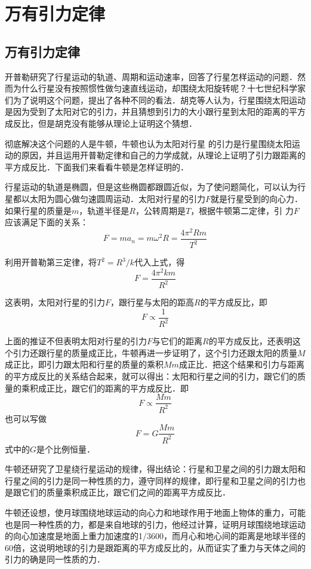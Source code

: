 \section{万有引力定律}
\subsection{万有引力定律} 

开普勒研究了行星运动的轨道、周期和运动速率，回答了行星怎样运动的问题．然而为什么行星没有按照惯性做匀速直线运动，却围绕太阳旋转呢？十七世纪科学家们为了说明这个问题，提出了各种不同的看法．胡克等人认为，行星围绕太阳运动是因为受到了太阳对它的引力，并且猜想到引力的大小跟行星到太阳的距离的平方成反比，但是胡克没有能够从理论上证明这个猜想．

彻底解决这个问题的人是牛顿，牛顿也认为太阳对行星
的引力是行星围绕太阳运动的原因，并且运用开普勒定律和自己的力学成就，从理论上证明了引力跟距离的平方成反比．下面我们来看看牛顿是怎样证明的．

行星运动的轨道是椭圆，但是这些椭圆都跟圆近似，为了使问题简化，可以认为行星都以太阳为圆心做匀速圆周运动．太阳对行星的引力$F$就是行星受到的向心力．如果行星的质量是$m$，轨道半径是$R$，公转周期是$T$，根据牛顿第二定律，引
力$F$应该满足下面的关系：
\[F=ma_n=m\omega^2 R=\frac{4\pi^2 Rm}{T^2} \]

利用开普勒第三定律，将$T^2=R^3/k$代入上式，得
\[F=\frac{4\pi^2km}{R^2} \]

这表明，太阳对行星的引力$F$，跟行星与太阳的距高$R$的平方成反比，即
\[F\propto \frac{1}{R^2} \]

上面的推证不但表明太阳对行星的引力$F$与它们的距离$R$的平方成反比，还表明这个引力还跟行星的质量成正比，牛顿再进一步证明了，这个引力还跟太阳的质量$M$成正比，即引力跟太阳和行星的质量的乘积$Mm$成正比．把这个结果和引力与距离的平方成反比的关系结合起来，就可以得出：太阳和行星之间的引力，跟它们的质量的乘积成正比，跟它们的距离的平方成反比．即
\[F\propto \frac{Mm}{R^2} \]
也可以写做
\[F=G\frac{Mm}{R^2} \]
式中的$G$是个比例恒量．

牛顿还研究了卫星绕行星运动的规律，得出结论：行星和卫星之间的引力跟太阳和行星之间的引力是同一种性质的力，遵守同样的规律，即行星和卫星之间的引力也是跟它们的质量乘积成正比，跟它们之间的距离平方成反比．

牛顿还设想，使月球围绕地球运动的向心力和地球作用于地面上物体的重力，可能也是同一种性质的力，都是来自地球的引力，他经过计算，证明月球围绕地球运动的向心加速度是地面上重力加速度的1/3600，而月心和地心间的距离是地球半径的60倍，这说明地球的引力是跟距离的平方成反比的，从而证实了重力与天体之间的引力的确是同一性质的力．


